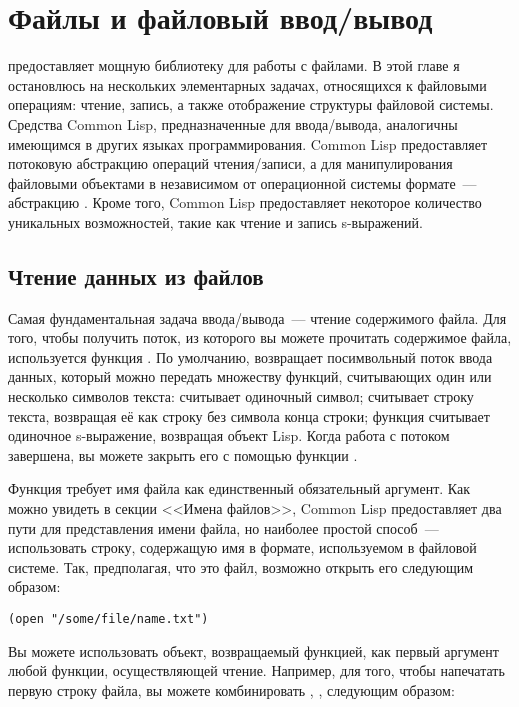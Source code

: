 \chapter{Файлы и файловый ввод/вывод}
\label{ch:14}

 предоставляет мощную библиотеку для работы с файлами. В этой главе я
остановлюсь на нескольких элементарных задачах, относящихся к файловыми операциям: чтение,
запись, а также отображение структуры файловой системы. Средства Common Lisp,
предназначенные для ввода/вывода, аналогичны имеющимся в других языках
программирования. Common Lisp предоставляет потоковую абстракцию операций чтения/записи, а
для манипулирования файловыми объектами в независимом от операционной системы формате~---
абстракцию . Кроме того, Common Lisp предоставляет некоторое
количество уникальных возможностей, такие как чтение и запись s-выражений.

\section{Чтение данных из файлов}

Самая фундаментальная задача ввода/вывода~--- чтение содержимого файла. Для того, чтобы
получить поток, из которого вы можете прочитать содержимое файла, используется функция
. По умолчанию,  возвращает посимвольный поток ввода данных, который
можно передать множеству функций, считывающих один или несколько символов текста:
 считывает одиночный символ;  считывает строку текста,
возвращая её как строку без символа конца строки; функция  считывает одиночное
s-выражение, возвращая объект Lisp. Когда работа с потоком завершена, вы можете закрыть
его с помощью функции .

Функция  требует имя файла как единственный обязательный аргумент. Как можно
увидеть в секции <<Имена файлов>>, Common Lisp предоставляет два пути для представления
имени файла, но наиболее простой способ~--- использовать строку, содержащую имя в формате,
используемом в файловой системе. Так, предполагая, что  это
файл, возможно открыть его следующим образом:

\begin{lstlisting}
(open "/some/file/name.txt")
\end{lstlisting}

Вы можете использовать объект, возвращаемый функцией, как первый аргумент любой функции,
осуществляющей чтение. Например, для того, чтобы напечатать первую строку файла, вы можете
комбинировать , ,  следующим образом:

